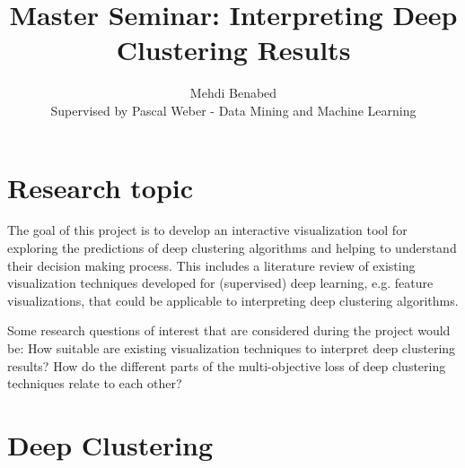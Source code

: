 \documentclass[runningheads]{llncs}
\begin{document}
%
\title{Master Seminar: Interpreting Deep Clustering Results}
%
%

\author{Mehdi Benabed\\{\small Supervised by Pascal Weber - Data Mining and Machine Learning}}


%
%
%
\maketitle              %
%

%
%
%

\section*{Research topic}
The goal of this project is to develop an interactive visualization tool for exploring the predictions of deep clustering algorithms and helping to understand their decision making process.
This includes a literature review of existing visualization techniques developed for (supervised) deep learning, e.g. feature visualizations, that could be applicable to interpreting deep clustering algorithms. 

Some research questions of interest that are considered during the project would be: How suitable are existing visualization techniques to interpret deep clustering results? How do the different parts of the multi-objective loss of deep clustering techniques relate to each other?

\section*{Deep Clustering}
\end{document}
